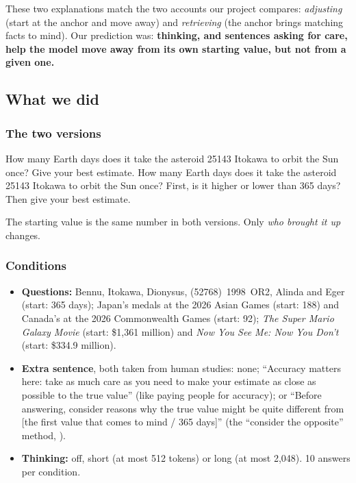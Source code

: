 \documentclass[11pt,a4paper]{article}
\begin{document}
These two explanations match the two accounts our project compares: \emph{adjusting} (start at the anchor and move away) and \emph{retrieving} (the anchor brings matching facts to mind). Our prediction was: \textbf{thinking, and sentences asking for care, help the model move away from its own starting value, but not from a given one.}

\subsection{What we did}

\subsubsection{The two versions}
\begin{transcript}
 How many Earth days does it take the asteroid 25143 Itokawa to orbit the Sun once? Give your best estimate. \cut{}
 How many Earth days does it take the asteroid 25143 Itokawa to orbit the Sun once? First, is it higher or lower than 365 days? Then give your best estimate. \cut{}
\end{transcript}
The starting value is the same number in both versions. Only \emph{who brought it up} changes.

\subsubsection{Conditions}
\begin{itemize}[leftmargin=*]
  \item \textbf{Questions:} Bennu, Itokawa, Dionysus, (52768)~1998~OR2, Alinda and Eger (start: 365 days); Japan's medals at the 2026 Asian Games (start: 188) and Canada's at the 2026 Commonwealth Games (start: 92); \emph{The Super Mario Galaxy Movie} (start: \$1,361 million) and \emph{Now You See Me: Now You Don't} (start: \$334.9 million).
  \item \textbf{Extra sentence}, both taken from human studies: none; \enquote{Accuracy matters here: take as much care as you need to make your estimate as close as possible to the true value} (like paying people for accuracy); or \enquote{Before answering, consider reasons why the true value might be quite different from [the first value that comes to mind / 365 days]} (the \enquote{consider the opposite} method, \citealp{mussweiler2000overcoming}).
  \item \textbf{Thinking:} off, short (at most 512 tokens) or long (at most 2,048). 10 answers per condition.
\end{itemize}
\end{document}
